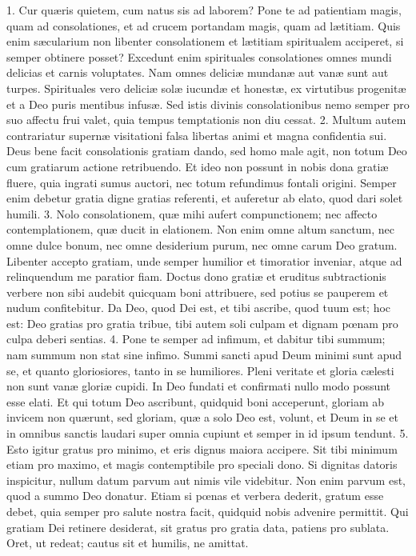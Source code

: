 1. Cur quæris quietem, cum natus sis ad laborem? Pone te ad patientiam magis, quam ad consolationes, et ad crucem portandam magis, quam ad lætitiam. Quis enim sæcularium non libenter consolationem et lætitiam spiritualem acciperet, si semper obtinere posset? Excedunt enim spirituales consolationes omnes mundi delicias et carnis voluptates. Nam omnes deliciæ mundanæ aut vanæ sunt aut turpes. Spirituales vero deliciæ solæ iucundæ et honestæ, ex virtutibus progenitæ et a Deo puris mentibus infusæ. Sed istis divinis consolationibus nemo semper pro suo affectu frui valet, quia tempus temptationis non diu cessat.
2. Multum autem contrariatur supernæ visitationi falsa libertas animi et magna confidentia sui. Deus bene facit consolationis gratiam dando, sed homo male agit, non totum Deo cum gratiarum actione retribuendo. Et ideo non possunt in nobis dona gratiæ fluere, quia ingrati sumus auctori, nec totum refundimus fontali origini. Semper enim debetur gratia digne gratias referenti, et auferetur ab elato, quod dari solet humili.
3. Nolo consolationem, quæ mihi aufert compunctionem; nec affecto contemplationem, quæ ducit in elationem. Non enim omne altum sanctum, nec omne dulce bonum, nec omne desiderium purum, nec omne carum Deo gratum. Libenter accepto gratiam, unde semper humilior et timoratior inveniar, atque ad relinquendum me paratior fiam. Doctus dono gratiæ et eruditus subtractionis verbere non sibi audebit quicquam boni attribuere, sed potius se pauperem et nudum confitebitur. Da Deo, quod Dei est, et tibi ascribe, quod tuum est; hoc est: Deo gratias pro gratia tribue, tibi autem soli culpam et dignam pœnam pro culpa deberi sentias.
4. Pone te semper ad infimum, et dabitur tibi summum; nam summum non stat sine infimo. Summi sancti apud Deum minimi sunt apud se, et quanto gloriosiores, tanto in se humiliores. Pleni veritate et gloria cælesti non sunt vanæ gloriæ cupidi. In Deo fundati et confirmati nullo modo possunt esse elati. Et qui totum Deo ascribunt, quidquid boni acceperunt, gloriam ab invicem non quærunt, sed gloriam, quæ a solo Deo est, volunt, et Deum in se et in omnibus sanctis laudari super omnia cupiunt et semper in id ipsum tendunt.
5. Esto igitur gratus pro minimo, et eris dignus maiora accipere. Sit tibi minimum etiam pro maximo, et magis contemptibile pro speciali dono. Si dignitas datoris inspicitur, nullum datum parvum aut nimis vile videbitur. Non enim parvum est, quod a summo Deo donatur. Etiam si pœnas et verbera dederit, gratum esse debet, quia semper pro salute nostra facit, quidquid nobis advenire permittit. Qui gratiam Dei retinere desiderat, sit gratus pro gratia data, patiens pro sublata. Oret, ut redeat; cautus sit et humilis, ne amittat.


